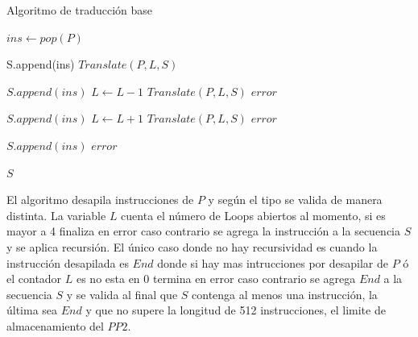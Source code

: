 \newpage

\begin{algorithm}
    \caption{Algoritmo de traducci\'on base}\label{euclid}
    \begin{algorithmic}[1]
    \State {}
    \State $ins \gets pop(P)$

    \State S.append(ins)
    \State $Translate(P, L, S)$
    \EndIf

            \State $S.append(\textit{ins})$
            \State $L \gets L-1$
            \State $Translate(P, L, S)$
        \Else
            \State \Return $error$
        \EndIf
    \EndIf
    
            \State $S.append(\textit{ins})$
            \State $L \gets L+1$
            \State $Translate(P, L, S)$
        \Else
            \State \Return $error$
        \EndIf
    \EndIf

            \State $S.append(\textit{ins})$
        \Else
            \State \Return $error$
        \EndIf
    \EndIf

    \State {}
    \State {}
    \State \Return $S$
    \EndProcedure
    \end{algorithmic}
    \end{algorithm}
    




    

El algoritmo desapila instrucciones de $P$ y seg\'un el tipo se valida de manera distinta.
La variable $L$ cuenta el n\'umero de Loops abiertos al momento, si es mayor a 4 finaliza en error
caso contrario se agrega la instrucci\'on a la secuencia $S$ y se aplica recursi\'on.
El \'unico caso donde no hay recursividad es cuando la instrucci\'on desapilada es $End$
donde si hay mas intrucciones por desapilar de $P$ \'o el contador $L$ es no esta en 0 termina en error
caso contrario se agrega $End$ a la secuencia $S$ y se valida al final que $S$ contenga al menos
una instrucci\'on, la \'ultima sea $End$ y que no supere la longitud de 512 instrucciones,
el limite de almacenamiento del $PP2$.


\newpage